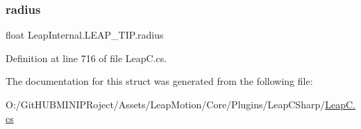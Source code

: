 \mbox{\label{struct_leap_internal_1_1_l_e_a_p___t_i_p_a38d148332dc4e11a12ed241427612c92}} 
\subsubsection{\texorpdfstring{radius}{radius}}
{\footnotesize\ttfamily float Leap\+Internal.\+L\+E\+A\+P\+\_\+\+T\+I\+P.\+radius}



Definition at line 716 of file Leap\+C.\+cs.



The documentation for this struct was generated from the following file\+:\begin{DoxyCompactItemize}
\item 
O\+:/\+Git\+H\+U\+B\+M\+I\+N\+I\+P\+Roject/\+Assets/\+Leap\+Motion/\+Core/\+Plugins/\+Leap\+C\+Sharp/\mbox{\hyperlink{_leap_c_8cs}{Leap\+C.\+cs}}\end{DoxyCompactItemize}
